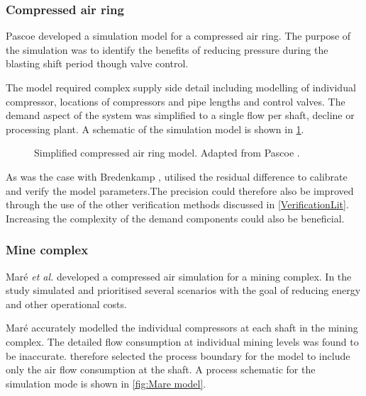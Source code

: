 \subsubsection{Compressed air ring}
Pascoe \cite{Pascoe2016Masters} developed a simulation model for a compressed air ring. The purpose of the simulation was to identify the benefits of reducing pressure during the blasting shift period though valve control.\par 
 The model required complex supply side detail including modelling of individual compressor, locations of compressors and pipe lengths and control valves. The demand aspect of the system was simplified to a single flow per shaft, decline or processing plant. A schematic of the simulation model is shown in \cref{fig:Pascoe  model}.
 \par
\begin{figure}[h!]
	\centering
	\caption[Simplified compressed air ring model.]{Simplified compressed air ring model. Adapted from Pascoe \cite{Pascoe2016Masters}.}
	\label{fig:Pascoe  model}
\end{figure}
As was the case with Bredenkamp \cite{Bredenkamp2013Masters}, \cite{Pascoe2016Masters} utilised the residual difference to calibrate and verify the model parameters.The precision could therefore also be improved through the use of the other verification methods discussed in \cref{VerificationLit}. Increasing the complexity of the demand components could also be beneficial.

\subsubsection{Mine complex}
Maré \textit{et al.} \cite{Mare2017Evaluating} developed a compressed air simulation for a mining complex. In the study \cite{Mare2017Evaluating} simulated and prioritised several scenarios with the goal of reducing energy and other operational costs. 
\par
  Maré accurately modelled the individual compressors at each shaft in the mining complex. The detailed flow consumption at individual mining levels was found to be inaccurate. \cite{Mare2017Evaluating} therefore selected the process boundary for the model to include only the air flow consumption at the shaft. A process schematic for the simulation mode is shown in \cref{fig:Mare model}.
  
